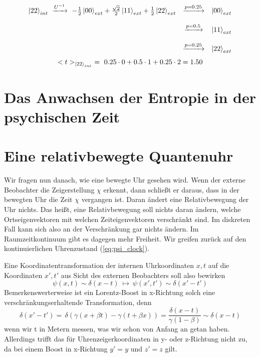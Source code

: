 \documentclass[12pt]{article}
\begin{document}
\begin{equation}
\begin{matrix}
\ket{22}_{int} \ \xrightarrow{U^{-1}} \ -\frac{1}{2}\ket{00}_{ext} + \frac{\sqrt{2}}{2}\ket{11}_{ext} + \frac{1}{2}\ket{22}_{ext} 
& \xrightarrow{p = 0.25} & \ket{00}_{ext} \\ \\
& \xrightarrow{p = 0.5} & \ket{11}_{ext} \\ \\
& \xrightarrow{p = 0.25} & \ket{22}_{ext}
\end{matrix}
\end{equation}
\begin{equation}
<t>_{\ket{22}_{int}} \ = \  0.25 \cdot 0 + 0.5 \cdot 1 + 0.25 \cdot 2 = 1.50
\end{equation}




\section{Das Anwachsen der Entropie in der psychischen Zeit}


\section{Eine relativbewegte Quantenuhr}

Wir fragen nun danach, wie eine bewegte Uhr gesehen wird. Wenn der externe Beobachter die Zeigerstellung $\chi$ erkennt, dann schließt er daraus, dass in der bewegten Uhr die Zeit $\chi$ vergangen ist. Daran ändert eine Relativbewegung der Uhr nichts. Das heißt, eine Relativbewegung soll nichts daran ändern, welche Ortseigenvektoren mit welchen Zeiteigenvektoren verschränkt sind. Im diskreten Fall kann sich also an der Verschränkung gar nichts ändern. Im Raumzeitkontinuum gibt es dagegen mehr Freiheit. Wir greifen zurück auf den kontinuierlichen Uhrenzustand (\ref{eq:psi_clock}). 

Eine Koordinatentransformation der internen Uhrkoordinaten $x,t$ auf die Koordinaten $x',t'$ aus Sicht des externen Beobachters soll also bewirken
\begin{equation} 
\psi(x,t) \sim \delta(x-t)\ \longmapsto \ \psi(x',t') \sim \delta(x'-t')
\end{equation} 
Bemerkenswerterweise ist ein Lorentz-Boost in x-Richtung solch eine verschränkungserhaltende Transformation, denn
\begin{equation} 
\delta(x'-t') =\, \delta(\gamma (x + \beta t) - \gamma (t + \beta x)) 
= \frac{\delta(x-t)}{\gamma (1-\beta)} \sim \delta(x-t)
\end{equation}
wenn wir t in Metern messen, was wir schon von Anfang an getan haben. Allerdings trifft das für Uhrenzeigerkoordinaten in y- oder z-Richtung nicht zu, da bei einem Boost in x-Richtung $y'=y$ und $z'=z$ gilt.
\end{document}
